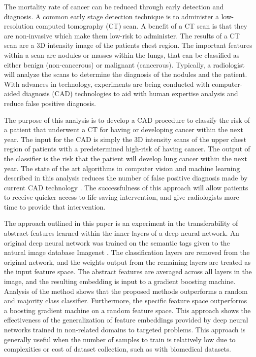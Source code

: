 \documentclass[conference,11pt]{IEEEtran}
\begin{document}
The mortality rate of cancer can be reduced through early detection and diagnosis. A common early stage detection technique is to administer a low-resolution computed tomography (CT) scan. A benefit of a CT scan is that they are non-invasive which make them low-risk to administer. The results of a CT scan are a 3D intensity image of the patients chest region. The important features within a scan are nodules or masses within the lungs, that can be classified as either benign (non-cancerous) or malignant (cancerous). Typically, a radiologist will analyze the scans to determine the diagnosis of the nodules and the patient. With advances in technology, experiments are being conducted with computer-aided diagnosis (CAD) technologies to aid with human expertise analysis and reduce false positive diagnosis.

The purpose of this analysis is to develop a CAD procedure to classify the risk of a patient that underwent a CT for having or developing cancer within the next year. The input for the CAD is simply the 3D intensity scans of the upper chest region of patients with a predetermined high-risk of having cancer. The output of the classifier is the risk that the patient will develop lung cancer within the next year. The state of the art algorithms in computer vision and machine learning described in this analysis reduces the number of false positive diagnosis made by current CAD technology \cite{sun_automatic_2017, ronneberger_u-net:_2015}. The successfulness of this approach will allow patients to receive quicker access to life-saving intervention, and give radiologists more time to provide that intervention.

The approach outlined in this paper is an experiment in the transferability of abstract features learned within the inner layers of a deep neural network. An original deep neural network was trained on the semantic tags given to the natural image database Imagenet \cite{russakovsky_imagenet_2015,yosinski_how_2014,he_deep_2015}. The classification layers are removed from the original network, and the weights output from the remaining layers are treated as the input feature space. The abstract features are averaged across all layers in the image, and the resulting embedding is input to a gradient boosting machine. Analysis of the method shows that the proposed methods outperforms a random and majority class classifier. Furthermore, the specific feature space outperforms a boosting gradient machine on a random feature space. This approach shows the effectiveness of the generalization of feature embeddings provided by deep neural networks trained in non-related domains to targeted problems. This approach is generally useful when the number of samples to train is relatively low due to complexities or cost of dataset collection, such as with biomedical datasets.
\end{document}
